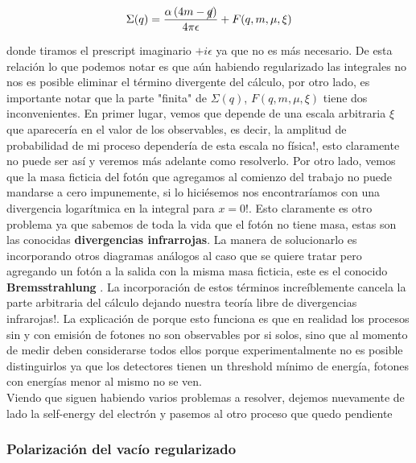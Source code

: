\documentclass[tickz]{article}
\numberwithin{equation}{section}
\begin{document}
\begin{boxquation}
\begin{equation}\label{sigmaregular}
\Sigma(q) = \frac{\alpha \left(4m - \cancel{q}\right)}{4\pi \epsilon} + F(q,m,\mu,\xi)
\end{equation}
\end{boxquation}

donde tiramos el prescript imaginario $ +i\epsilon $ ya que no es más necesario. De esta relación lo que podemos notar es que aún habiendo regularizado las integrales no nos es posible eliminar el término divergente del cálculo, por otro lado, es importante notar que la parte "finita" de $ \Sigma(q) $, $ F(q,m,\mu,\xi) $ tiene dos inconvenientes. En primer lugar, vemos que depende de una escala arbitraria $ \xi $ que aparecería en el valor de los observables, es decir, la amplitud de probabilidad de mi proceso dependería de esta escala no física!, esto claramente no puede ser así y veremos más adelante como resolverlo. Por otro lado, vemos que la masa ficticia del fotón que agregamos al comienzo del trabajo no puede mandarse a cero impunemente, si lo hiciésemos nos encontraríamos con una divergencia logarítmica en la integral para $ x=0 $!. Esto claramente es otro problema ya que sabemos de toda la vida que el fotón no tiene masa, estas son las conocidas \textbf{divergencias infrarrojas}. La manera de solucionarlo es incorporando otros diagramas análogos al caso que se quiere tratar pero agregando un fotón a la salida con la misma masa ficticia, este es el conocido \textbf{Bremsstrahlung }. La incorporación de estos términos increíblemente cancela la parte arbitraria del cálculo dejando nuestra teoría libre de divergencias infrarojas!. La explicación de porque esto funciona es que en realidad los procesos sin y con emisión de fotones no son observables por si solos, sino que al momento de medir deben considerarse todos ellos porque experimentalmente no es posible distinguirlos ya que los detectores tienen un threshold mínimo de energía, fotones con energías menor al mismo no se ven.\\

Viendo que siguen habiendo varios problemas a resolver, dejemos nuevamente de lado la self-energy del electrón y pasemos al otro proceso que quedo pendiente
  

\subsubsection{Polarización del vacío regularizado}
\end{document}
